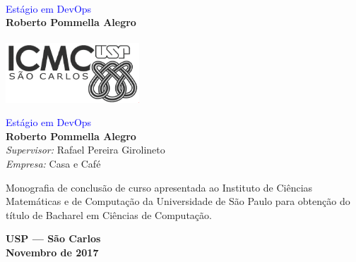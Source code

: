 \documentclass[12pt,times,a4paper,twoside]{icmc}
\newcommand{\tituloMonografia}{Estágio em DevOps}
\newcommand{\nomeAluno}{Roberto Pommella Alegro}
\newcommand{\nomeSupervisor}{Rafael Pereira Girolineto}
\newcommand{\nomeEmpresa}{Casa e Café}
\begin{document}

\begin{titlepage}
\pagestyle{empty} %

\begin{center}
\begin{minipage}[c]{12cm}
\begin{center}
\vspace{.35\textheight}
\hrulefill\\
    \vspace{.5cm} {\Large \textcolor{blue}{\tituloMonografia}}\\
    \vspace{1.3cm}
    \textbf{\nomeAluno}\\
      \vspace{.5cm}
      \hrulefill\\
        \vspace{5cm}
        \includegraphics[width=5cm]{img/logoICMC.png}
        \end{center}
        \end{minipage}
        \end{center}


        \cleardoublepage%


        \vspace*{3cm}
        \begin{center}
{\huge\sf \textcolor{blue}{\tituloMonografia}} \\
    \vspace*{2cm}
{\bf \nomeAluno} \\
    \vspace*{2cm}
    \emph{Supervisor:}  {\nomeSupervisor}\\
      \emph{Empresa:}  {\nomeEmpresa}
      \end{center}
      \vspace*{3cm}

      \begin{flushright}
      \begin{minipage}{10cm}
      Monografia de conclusão de curso apresentada ao
      Instituto de Ciências Matemáticas e de Computação da Universidade de São Paulo para obtenção do título de Bacharel em
      Ciências de Computação.
      \end{minipage}
      \end{flushright}

      \vspace*{2cm}
      \begin{center}
      \textbf{USP --- São Carlos \\ Novembro de 2017}
      \end{center}

      \cleardoublepage%

      \end{titlepage}
\end{document}
